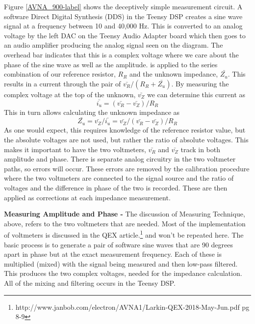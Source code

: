 Figure \ref{AVNA_900-label} shows the deceptively simple measurement circuit.  A software Direct Digital Synthesis (DDS) in the Teensy DSP creates a sine wave signal at a frequency between 10 and 40,000 Hz.  This is converted to an analog voltage by the left DAC on the Teensy Audio Adapter board which then goes to an audio amplifier producing the analog signal   seen on the diagram.
The overhead bar indicates that this is a complex voltage where we care about the phase of the sine wave as well as the amplitude.   is applied to the series combination of our reference resistor, \(R_R\) and the unknown impedance, \(\bar{Z_u}\).  This results in a current through the pair  of \(\bar{v_R}/(R_R + \bar{Z_u})\).  By measuring the complex voltage at the top of the unknown, \(\bar{v_Z}\) we can determine this current as
\begin{equation}
 \bar{i_u}=(\bar{v_R} -\bar{v_Z})/R_R
\end{equation}
 This in turn allows calculating the unknown impedance as
\begin{equation}
 \bar{Z_u} = \bar{v_Z}/\bar{i_u}
                    = \bar{v_Z}/(\bar{v_R}-\bar{v_Z})/R_R
\end{equation}
As one would expect, this requires knowledge of the reference resistor value, but the absolute voltages are not used, but rather the ratio of absolute voltages.  This makes it important to have the two voltmeters, \(\bar{v_R}\) and \(\bar{v_Z}\) track in both amplitude and phase.  There is separate analog circuitry in the two voltmeter paths, so errors will occur.  These errors are removed by the calibration procedure where the two voltmeters are connected to the signal source and the ratio  of voltages and the difference in phase of the two is recorded. These are then applied as corrections at each impedance measurement.

\textbf{Measuring Amplitude and Phase - }The discussion of Measuring Technique, above, refers to the two voltmeters that are needed.  Most of the  implementation of voltmeters is discussed in the QEX article.\footnote{http://www.janbob.com/electron/AVNA1/Larkin-QEX-2018-May-Jun.pdf pg 8-9}
%
and won't be repeated here.  The basic process is to generate a pair of software sine waves that are 90 degrees apart in phase but at the exact measurement frequency.  Each of these is multiplied (mixed) with the signal being measured and then low-pass filtered.  This produces the two complex voltages, needed for the impedance calculation.  All of the mixing and filtering occurs in the Teensy DSP.